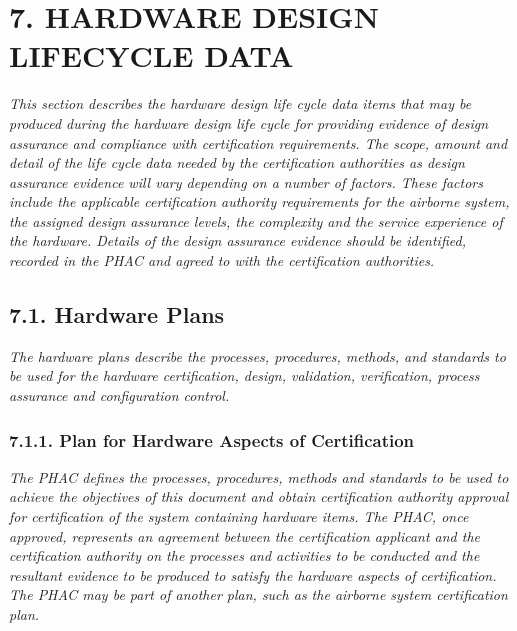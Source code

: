 \documentclass[
]{article}
\begin{document}
\hypertarget{hardware-design-lifecycle-data}{%
\section{7. HARDWARE DESIGN LIFECYCLE
DATA}\label{hardware-design-lifecycle-data}}

\emph{This section describes the hardware design life cycle data items
that may be produced during the hardware design life cycle for providing
evidence of design assurance and compliance with certification
requirements. The scope, amount and detail of the life cycle data needed
by the certification authorities as design assurance evidence will vary
depending on a number of factors. These factors include the applicable
certification authority requirements for the airborne system, the
assigned design assurance levels, the complexity and the service
experience of the hardware. Details of the design assurance evidence
should be identified, recorded in the PHAC and agreed to with the
certification authorities.}

\hypertarget{hardware-plans}{%
\subsection{7.1. Hardware Plans}\label{hardware-plans}}

\emph{The hardware plans describe the processes, procedures, methods,
and standards to be used for the hardware certification, design,
validation, verification, process assurance and configuration control.}

\hypertarget{plan-for-hardware-aspects-of-certification}{%
\subsubsection{7.1.1. Plan for Hardware Aspects of
Certification}\label{plan-for-hardware-aspects-of-certification}}

\emph{The PHAC defines the processes, procedures, methods and standards
to be used to achieve the objectives of this document and obtain
certification authority approval for certification of the system
containing hardware items. The PHAC, once approved, represents an
agreement between the certification applicant and the certification
authority on the processes and activities to be conducted and the
resultant evidence to be produced to satisfy the hardware aspects of
certification. The PHAC may be part of another plan, such as the
airborne system certification plan.}
\end{document}
